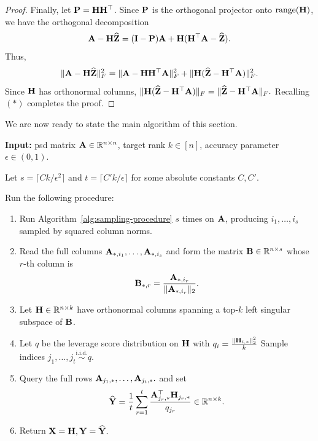 \begin{proof}
Finally, let \(\mathbf{P}=\mathbf{H}\mathbf{H}^\top\). Since \(\mathbf{P}\) is the orthogonal projector
onto \(\operatorname{range}(\mathbf{H})\), we have the orthogonal decomposition
\[
    \mathbf{A}-\mathbf{H}\widehat{\mathbf{Z}}
    =
    (\mathbf{I}-\mathbf{P})\mathbf{A}+\mathbf{H}(\mathbf{H}^\top\mathbf{A}-\widehat{\mathbf{Z}}).
\]
Thus,
\[
    \|\mathbf{A}-\mathbf{H}\widehat{\mathbf{Z}}\|_F^2
    =
    \|\mathbf{A}-\mathbf{H}\mathbf{H}^\top\mathbf{A}\|_F^2
    +
    \|\mathbf{H}(\widehat{\mathbf{Z}}-\mathbf{H}^\top\mathbf{A})\|_F^2.
\]
Since \(\mathbf{H}\) has orthonormal columns,
\(
    \|\mathbf{H}(\widehat{\mathbf{Z}}-\mathbf{H}^\top\mathbf{A})\|_F
    =
    \|\widehat{\mathbf{Z}}-\mathbf{H}^\top\mathbf{A}\|_F.
\)
Recalling $(\ast)$ completes the proof.
\end{proof}

We are now ready to state the main algorithm of this section.

\begin{algorithm}[H]
\caption{Sublinear PSD Low-Rank Approximation}
\label{alg:sublinear-psd-low-rank}

\noindent
\textbf{Input:} psd matrix
\(\mathbf{A}\in\mathbb{R}^{n\times n}\), target rank \(k\in[n]\), accuracy
parameter \(\epsilon\in (0,1)\).

\smallskip
Let
\(
    s=\lceil Ck/\epsilon^2\rceil
\)
and $t = \lceil C'k/\epsilon\rceil$ for some absolute constants $C, C'$.

\smallskip
Run the following procedure:
\begin{enumerate}[
    label=\arabic*.,
    leftmargin=2em,
    itemsep=0.35em,
    topsep=0.45em,
    parsep=0pt
]
    \item Run Algorithm~\ref{alg:sampling-procedure} $s$ times on $\mathbf{A}$, producing
    \(
        i_1,\ldots,i_s
    \)
    sampled by squared column norms.

    \item Read the full columns
    \(
        \mathbf{A}_{*,i_1},\ldots,\mathbf{A}_{*,i_s}
    \)
    and form the matrix \(\mathbf{B}\in\mathbb{R}^{n\times s}\) whose \(r\)-th column is
    \[
        \mathbf{B}_{*,r}
        =
        \frac{\mathbf{A}_{*,i_r}}{\|\mathbf{A}_{*,i_r}\|_2}.
    \]

    \item Let \(\mathbf{H}\in\mathbb{R}^{n\times k}\) have orthonormal columns spanning a top-\(k\) left singular subspace of \(\mathbf{B}\).

    \item Let $q$ be the leverage score distribution on $\mathbf{H}$ with
    \(
        q_i=\frac{\|\mathbf{H}_{i,*}\|_2^2}{k}
    \)
    Sample indices
    \(
        j_1,\ldots,j_t \overset{\mathrm{i.i.d.}}{\sim} q.
    \)
    \item Query the full rows
    \(
        \mathbf{A}_{j_1,*},\ldots,\mathbf{A}_{j_t,*}.
    \)
    and set
    \[
        \widehat{\mathbf{Y}}
        =
        \frac{1}{t}\sum_{r=1}^t
        \frac{\mathbf{A}_{j_r,*}^{\top}\mathbf{H}_{j_r,*}}{q_{j_r}}
        \in\mathbb{R}^{n\times k}.
    \]

    \item Return
    \(
        \mathbf{X}=\mathbf{H},
        \mathbf{Y}=\widehat{\mathbf{Y}}.
    \)
\end{enumerate}
\end{algorithm}


